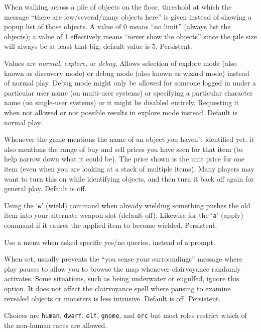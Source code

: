 \documentclass[titlepage]{article}
\begin{document}
\begin{description}[font=\mdseries\itshape]
When walking across a pile of objects on the floor, threshold at which
the message ``there are few/several/many objects here'' is given instead
of showing a popup list of those objects.  A value of 0 means ``no limit''
(always list the objects); a value of 1 effectively means ``never show
the objects'' since the pile size will always be at least that big;
default value is 5.  Persistent.
\item[playmode]
Values are \textit{normal}, \textit{explore}, or \textit{debug}.
Allows selection of explore mode (also known as discovery mode) or debug
mode (also known as wizard mode) instead of normal play.
Debug mode might only be allowed for someone logged in under a particular
user name (on multi-user systems) or specifying a particular character
name (on single-user systems) or it might be disabled entirely.  Requesting
it when not allowed or not possible results in explore mode instead.
Default is normal play.
\item[price\textunderscore quotes]
Whenever the game mentions the name of an object you haven't identified yet,
it also mentions the range of buy and sell prices you have seen for that
item (to help narrow down what it could be).
The price shown is the unit price for one item (even when you are looking at
a stack of multiple items).
Many players may want to turn this on while identifying objects, and then
turn it back off again for general play.
Default is off.
\item[pushweapon]
Using the `\texttt{w}' (wield) command when already wielding
something pushes the old item into your alternate weapon slot (default off).
Likewise for the `\texttt{a}' (apply) command if it causes the applied item to
become wielded.  Persistent.
\item[query\textunderscore menu]
Use a menu when asked specific yes/no queries, instead of a prompt.
\item[quick\textunderscore farsight]
When set, usually prevents the ``you sense your surroundings'' message
where play pauses to allow you to browse the map whenever clairvoyance
randomly activates.
Some situations, such as being underwater or engulfed, ignore this option.
It does not affect the clairvoyance spell where pausing to examine revealed
objects or monsters is less intrusive.
Default is off.  Persistent.
\item[race]
Choices are \texttt{human}, \texttt{dwarf}, \texttt{elf}, \texttt{gnome}, and
\texttt{orc} but most roles restrict which of the non-human races are allowed.

\end{description}
\end{document}
